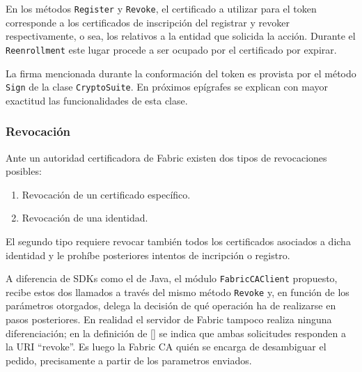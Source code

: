 En los m\'etodos \texttt{Register} y \texttt{Revoke}, el certificado a utilizar para el token corresponde a los certificados de inscripci\'on del registrar y revoker respectivamente, o sea, los relativos a la entidad que solicida la acci\'on. Durante el \texttt{Reenrollment} este lugar procede a ser ocupado por el certificado por expirar.

La firma mencionada durante la conformaci\'on del token es provista por el m\'etodo \texttt{Sign} de la clase \texttt{CryptoSuite}. En pr\'oximos ep\'igrafes se explican con mayor exactitud las funcionalidades de esta clase.



\subsubsection{Revocaci\'on}

Ante un autoridad certificadora de Fabric existen dos tipos de revocaciones posibles: 

\begin{enumerate}
	\item Revocaci\'on de un certificado espec\'ifico.
	\item Revocaci\'on de una identidad.
\end{enumerate}

El segundo tipo requiere revocar tambi\'en todos los certificados asociados a dicha identidad y le proh\'ibe posteriores intentos de incripci\'on o registro.%

A diferencia de SDKs como el de Java, el m\'odulo \texttt{FabricCAClient} propuesto, recibe estos dos llamados a trav\'es del mismo m\'etodo \texttt{Revoke} y, en funci\'on de los par\'ametros otorgados, delega la decisi\'on de qu\'e operaci\'on ha de realizarse en pasos posteriores. En realidad el servidor de Fabric tampoco realiza ninguna diferenciaci\'on; en la definici\'on de [\cite{hlfcaswagger}] se indica que ambas solicitudes responden a la URI “revoke”. Es luego la Fabric CA qui\'en se encarga de desambiguar el pedido, precisamente a partir de los parametros enviados.%

